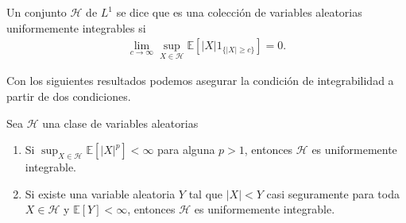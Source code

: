 \begin{definition}
Un conjunto $\mathcal{H}$ de $L^1$ se dice que es una colección de variables aleatorias uniformemente integrables si
	\begin{align*}
	\lim_{c \rightarrow \infty} \sup_{X \in \mathcal{H}} \mathbb{E}[|X| 1_{ \{|X| \geq c\} }] = 0.
	\end{align*}
\end{definition}

Con los siguientes resultados podemos asegurar la condición de integrabilidad a partir de dos condiciones.

\begin{proposition}
Sea $\mathcal{H}$ una clase de variables aleatorias
	\begin{enumerate}
	\item Si $\sup_{X \in \mathcal{H}} \mathbb{E}[|X|^p] < \infty$ para alguna $p > 1$, entonces $\mathcal{H}$ es uniformemente integrable.
	\item Si existe una variable aleatoria $Y$ tal que $|X| < Y$ casi seguramente para toda $X \in \mathcal{H}$ y $\mathbb{E}[Y] < \infty$, entonces $\mathcal{H}$ es uniformemente integrable.
	\end{enumerate}
\end{proposition}

